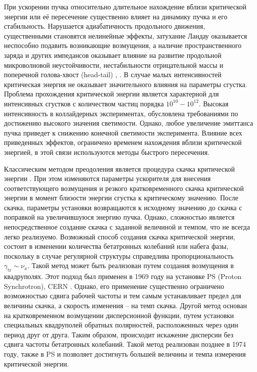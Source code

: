 \par При ускорении пучка относительно длительное нахождение вблизи критической энергии или её пересечение существенно влияет на динамику пучка и его стабильность. Нарушается адиабатичность продольного движения, существенными становятся нелинейные эффекты, затухание Ландау оказывается неспособно подавить возникающие возмущения, а наличие пространственного заряда и других импедансов оказывает влияние на развитие продольной микроволновой неустойчивости, нестабильности отрицательной массы и поперечной голова-хвост (head-tail) \cite{ng}, \cite{lee}. В случае малых интенсивностей критическая энергия не оказывает значительного влияния на параметры сгустка. Проблема прохождения критической энергии является характерной для интенсивных сгустков с количеством частиц порядка $10^{10}-10^{12}$. Высокая интенсивность в коллайдерных экспериментах, обусловлена требованиями по достижению высокого значения светимости. Однако, любое увеличение эмиттанса пучка приведет к снижению конечной светимости эксперимента. Влияние всех приведенных эффектов, ограничено временем нахождения вблизи критической энергией, в этой связи используются методы быстрого пересечения.

\par Классическим методом преодоления является процедура скачка критической энергии \cite{risselada:jump}. При этом изменяются параметры ускорителя для внесения соответствующего возмущения и резкого кратковременного скачка критической энергии в момент близости энергии сгустка к критическому значению. После скачка, параметры установки возвращаются к исходному значению до скачка с поправкой на увеличившуюся энергию пучка. Однако, сложностью является непосредственное создание скачка с заданной величиной и темпом, что не всегда легко реализуемо. Возможный способ создания скачка критической энергии, состоит в изменении количества бетатронных колебаний или набега фазы, поскольку в случае регулярной структуры справедлива пропорциональность $\gamma_{\text{tr}} \sim \nu_{x}$. Такой метод может быть реализован путем создания возмущения в квадруполях. Этот подход был применен в 1969 году на установке PS (Proton Synchrotron), CERN \cite{cern:q-jump}. Однако, его применение существенно ограничено возможностью сдвига рабочей частоты и тем самым устанавливает предел для величины скачка, а скорость изменения -- на темп скачка. Другой метод основан на кратковременном возмущении дисперсионной функции, путем установки специальных квадруполей обратных полярностей, расположенных через один период друг от друга.  Таким образом, происходит искажение дисперсии без сдвига частоты бетатронных колебаний. Такой метод реализован позднее в 1974 году, также в PS \cite{cern:new-jump} и позволяет достигнуть большей величины и темпа измерения критической энергии.

